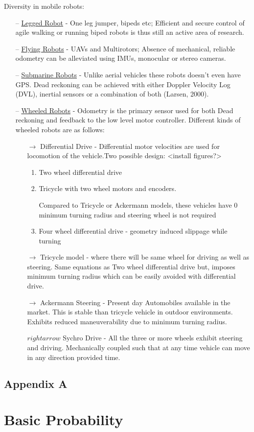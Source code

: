 \documentclass{article}
\begin{document}
Diversity in mobile robots:
\begin{itemize}[noitemsep,topsep=0pt]
\item[--] 	
\setul{1pt}{.4pt}\ul{Legged Robot} - One leg jumper, bipeds etc; Efficient and secure control of agile walking
or running biped robots is thus still an active area
of research.
\item[--]
\setul{1pt}{.4pt}\ul{Flying Robots} - UAVs and Multirotors; Absence of mechanical, reliable odometry can be alleviated using IMUs, monocular or stereo cameras. 
\item[--]
\setul{1pt}{.4pt}\ul{Submarine Robots} - Unlike aerial vehicles these robots doesn't even have GPS. Dead reckoning can be achieved with either
Doppler Velocity Log (DVL), inertial sensors or
a combination of both (Larsen, 2000).
\item[--]
\setul{1pt}{.4pt}\ul{Wheeled Robots} - Odometry is the primary sensor used for both Dead reckoning and feedback to the low level motor controller. Different kinds of wheeled robots are as follows:
\begin{itemize}
	\item[$\rightarrow$] Differential Drive -  Differential motor velocities are used for locomotion of the vehicle.Two possible design: <install figures?>
	\begin{enumerate}
		\item Two wheel differential drive
		\item Tricycle with two wheel motors and encoders.
		 
		Compared to Tricycle or Ackermann models, these vehicles have $0$ minimum turning radius and steering wheel is not required
		\item Four wheel differential drive - geometry induced slippage while turning
	
	\end{enumerate}
	\item[$\rightarrow$] Tricycle model - where there will be same wheel for driving as well as steering. Same equations as Two wheel differential drive but, imposes minimum turning radius which can be easily avoided with differential drive. 
	\item[$\rightarrow$] Ackermann Steering - Present day Automobiles available in the market. This is stable than tricycle vehicle in outdoor environments. Exhibits reduced maneuverability due to minimum turning radius. 
	\item[$rightarrow$] Sychro Drive - All the three or more wheels exhibit steering and driving. Mechanically coupled such that at any time vehicle can move in any direction provided time.  
\end{itemize}


\end{itemize}
\newpage
\begin{center}
	\section*{Appendix A}
\end{center}
\section*{Basic Probability}
\end{document}
